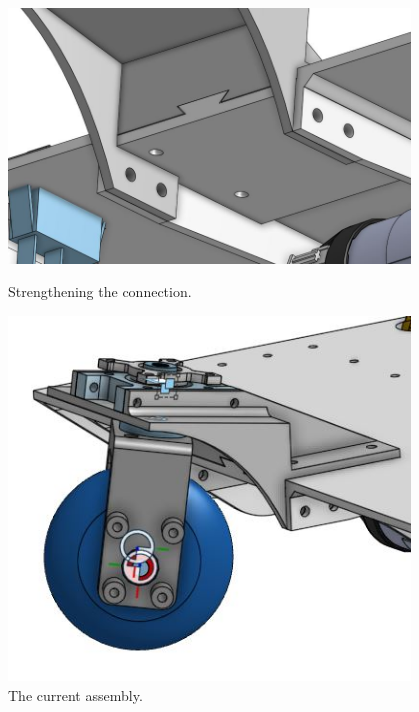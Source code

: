 \begin{figure}[ht]
\centering
\begin{minipage}[b]{.48\textwidth}
  \centering
  \includegraphics[width=0.95\textwidth]{Meetings/October/10-15-21/10-15-21_CAD_Figure3 - Nathan Forrer.JPG}
  \caption{Strengthening the connection.}
  \label{fig:101521_3}
\end{minipage}%
\hfill%
\begin{minipage}[b]{.48\textwidth}
  \centering
  \includegraphics[width=0.95\textwidth]{Meetings/October/10-15-21/10-15-21_CAD_Figure4 - Nathan Forrer.JPG}
  \caption{The current assembly.}
  \label{fig:101521_4}
\end{minipage}
\end{figure}


